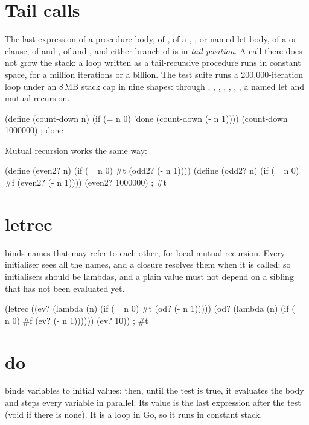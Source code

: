\section{Tail calls}

The last expression of a procedure body, of , of a ,
,  or named-let body, of a  or
 clause, of  and , of  and
, and either branch of  is in \emph{tail position}. A
call there does not grow the stack: a loop written as a tail-recursive
procedure runs in constant space, for a million iterations or a billion.
The test suite runs a 200,000-iteration loop under an 8\,MB stack cap in
nine shapes: through , , , ,
, , , a named let and mutual recursion.

\begin{scm}
(define (count-down n)
  (if (= n 0) 'done (count-down (- n 1))))
(count-down 1000000)    ; done
\end{scm}

Mutual recursion works the same way:

\begin{scm}
(define (even2? n) (if (= n 0) #t (odd2? (- n 1))))
(define (odd2? n)  (if (= n 0) #f (even2? (- n 1))))
(even2? 1000000)        ; #t
\end{scm}

\section{letrec}

 binds names that may refer to each other, for local mutual
recursion. Every initialiser sees all the names, and a closure resolves
them when it is called; so initialisers should be lambdas, and a plain value
must not depend on a sibling that has not been evaluated yet.

\begin{scm}
(letrec ((ev? (lambda (n) (if (= n 0) #t (od? (- n 1)))))
         (od? (lambda (n) (if (= n 0) #f (ev? (- n 1))))))
  (ev? 10))   ; #t
\end{scm}

\section{do}

 binds variables to initial values; then, until the test is true,
it evaluates the body and steps every variable in parallel. Its value is
the last expression after the test (void if there is none). It is a loop in
Go, so it runs in constant stack.

